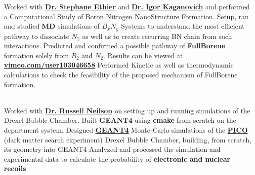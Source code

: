 \documentclass[]{deedy-resume-openfont}
\begin{document}
\begin{minipage}[t]{0.55\textwidth}
Worked with \textbf{\href{https://theory.pppl.gov/people/profile.php?pid=40&n=St\%C3\%A9phane-Ethier}{Dr. Stephane Ethier}} and \textbf{\href{https://theory.pppl.gov/people/profile.php?pid=2&n=Igor-Kaganovich}{Dr. Igor Kaganovich}} and performed a Computational Study of Boron Nitrogen NanoStructure Formation.
\vspace{4}
\newline
\vspace{0.001}
\textbullet{} Setup, ran and studied \textbf{MD} simulations of $B_xN_y$ Systems to understand the most efficient pathway to dissociate $N_2$ as well as to create recurring BN chain from such interactions.
\newline
\textbullet{} Predicted and confirmed a possible pathway of \textbf{FullBorene} formation solely from $B_2$ and $N_2$. Results can be viewed at \textbf{\href{https://vimeo.com/user103046658}{vimeo.com/user103046658}}
\newline
\textbullet{} Performed Kinetic as well as thermodynamic calculations to check the feasibility of the proposed mechanism of FullBorene formation.




\sectionsep
{}\\
Worked with \textbf{\href{https://drexel.edu/coas/faculty-research/faculty-directory/Neilson\%20Russell/}{Dr. Russell Neilson}} on setting up and running simulations of the Drexel Bubble Chamber. 
\vspace{4}
\newline
\vspace{0.001}
\textbullet{} Built {\textbf{GEANT4}} using {\textbf{cmake}} from scratch on the department system.
\newline
\textbullet{} Designed \href{https://geant4.web.cern.ch/}{\textbf{GEANT4}} Monte-Carlo simulations of the \href{https://www.picoexperiment.com/}{\textbf{PICO}} (dark matter search experiment) Drexel Bubble Chamber, building, from scratch, its geometry into GEANT4
\newline
\textbullet{} Analyzed and processed the simulation and experimental data to calculate the probability of \textbf{electronic and nuclear recoils}
\sectionsep


\end{minipage}
\end{document}
